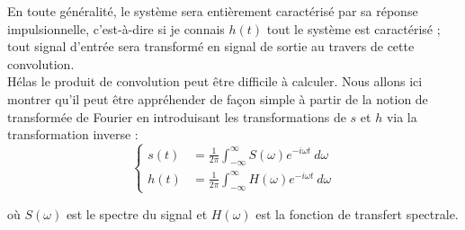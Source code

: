 En toute généralité, le système sera entièrement caractérisé par sa réponse impulsionnelle, c'est-à-dire 
si je connais $h(t)$ tout le système est caractérisé ; tout signal d'entrée sera transformé en 
signal de sortie au travers de cette convolution.\\

Hélas le produit de convolution peut être difficile à calculer. Nous allons ici montrer qu'il peut 
être appréhender de façon simple à partir de la notion de transformée de Fourier en introduisant 
les transformations de $s$ et $h$ via la transformation inverse :
\begin{equation}
\left\{\begin{array}{ll}
s(t) &= \frac{1}{2\pi}\int_{-\infty}^\infty S(\omega)e^{-i\omega t}\ d\omega\\
h(t) &= \frac{1}{2\pi}\int_{-\infty}^\infty H(\omega)e^{-i\omega t}\ d\omega
\end{array}\right.
\end{equation}

où $S(\omega)$ est le spectre du signal et $H(\omega)$ est la fonction de transfert spectrale.

